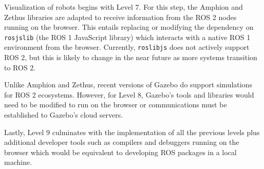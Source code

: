         Visualization of robots begins with Level 7. For this step, the Amphion and Zethus libraries are adapted to receive information from the \ac{ROS} 2 nodes running on the browser. This entails replacing or modifying the dependency on \texttt{rosjslib} (the \ac{ROS} 1 JavaScript library) which interacts with a native \ac{ROS} 1 environment from the browser. Currently, \texttt{roslibjs} does not actively support \ac{ROS} 2, but this is likely to change in the near future as more systems transition to \ac{ROS} 2.

        Unlike Amphion and Zethus, recent versions of Gazebo do support simulations for \ac{ROS} 2 ecosystems. However, for Level 8, Gazebo's tools and libraries would need to be modified to run on the browser or communications must be established to Gazebo's cloud servers.

        Lastly, Level 9 culminates with the implementation of all the previous levels plus additional developer tools such as compilers and debuggers running on the browser which would be equivalent to developing \ac{ROS} packages in a local machine.
